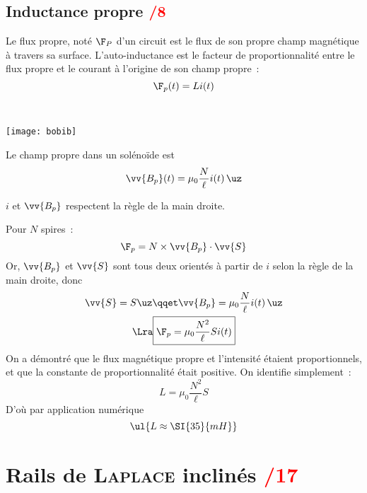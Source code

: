 \documentclass[11pt]{book}
\begin{document}
{	\subsection{Inductance propre \hfill \textcolor{red}{/8}}
	\label{ssec:indprp}
	\begin{enumerate}
		 Le flux propre, noté $\F_P$ d'un circuit est le flux de son propre
		champ magnétique à travers sa surface.
		 L'auto-inductance est le facteur de proportionnalité entre le flux
		propre et le courant à l'origine de son champ propre~:
		\[
			\F_p(t) = Li(t)
		\]
		 \noindent
		\begin{minipage}[t]{.4\linewidth}
			~
			\begin{center}
				\texttt{[image: bobib]}
				\label{fig:bobib}
			\end{center}
		\end{minipage}
		\hfill
		\begin{minipage}[t]{.69\linewidth}
			Le champ propre dans un solénoïde est
			\[
				\vv{B_p}(t) = \mu_0 \frac{N}{\ell }i(t)\,\uz
			\]

			$i$ et $\vv{B_p}$ respectent la règle de la main droite.
		\end{minipage}
		Pour $N$ spires~:
		\[
			\F_p = N\times \vv{B_p}\cdot \vv{S}
		\]
		Or, $\vv{B_p}$ et $\vv{S}$ sont tous deux orientés à partir de $i$ selon
		la règle de la main droite, donc
		\begin{gather*}
			\vv{S} = S\uz
			\qqet
			\vv{B_p} = \mu_0 \frac{N}{\ell }i(t)\,\uz
			\\\Lra
			\boxed{\F_p = \mu_0 \frac{N^2}{\ell }Si(t)}
		\end{gather*}
		On a démontré que le flux magnétique propre et l'intensité étaient
		proportionnels, et que la constante de proportionnalité était positive.
		On identifie simplement~:
		\[
			\boxed{L = \mu_0 \frac{N^2}{\ell }S}
		\]
		D'où par application numérique
		\[
			\ul{L \approx \SI{35}{mH}}
		\]

	\end{enumerate}
}

\section{Rails de \textsc{Laplace} inclinés \hfill \textcolor{red}{/17}}
\label{sec:rlplincl}
\end{document}
